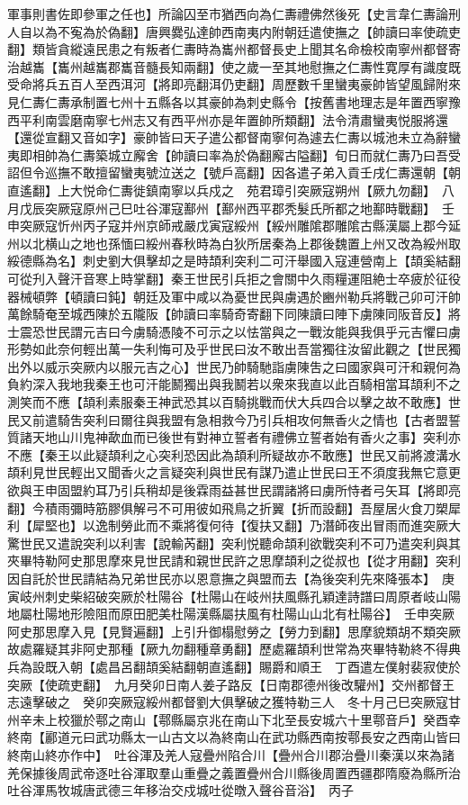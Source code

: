軍事則書佐即參軍之任也】所論囚至市猶西向為仁夀禮佛然後死【史言韋仁夀論刑人自以為不寃為於偽翻】唐興爨弘達帥西南夷内附朝廷遣使撫之【帥讀曰率使疏吏翻】類皆貪縱遠民患之有叛者仁夀時為巂州都督長史上聞其名命檢校南寧州都督寄治越巂【巂州越巂郡巂音髓長知兩翻】使之歲一至其地慰撫之仁夀性寛厚有識度既受命將兵五百人至西洱河【將即亮翻洱仍吏翻】周歷數千里蠻夷豪帥皆望風歸附來見仁夀仁夀承制置七州十五縣各以其豪帥為刺史縣令【按舊書地理志是年置西寧豫西平利南雲磨南寧七州志又有西平州亦是年置帥所類翻】法令清肅蠻夷悦服將還【還從宣翻又音如字】豪帥皆曰天子遣公都督南寧何為遽去仁夀以城池未立為辭蠻夷即相帥為仁夀築城立廨舍【帥讀曰率為於偽翻廨古隘翻】旬日而就仁夀乃曰吾受詔但令巡撫不敢擅留蠻夷號泣送之【號戶高翻】因各遣子弟入貢壬戌仁夀還朝【朝直遙翻】上大悦命仁夀徙鎮南寧以兵戍之　苑君璋引突厥寇朔州【厥九勿翻】　八月戊辰突厥寇原州己巳吐谷渾寇鄯州【鄯州西平郡秃髮氏所都之地鄯時戰翻】　壬申突厥寇忻州丙子寇并州京師戒嚴戊寅寇綏州【綏州雕隂郡雕隂古縣漢屬上郡今延州以北横山之地也孫愐曰綏州春秋時為白狄所居秦為上郡後魏置上州又改為綏州取綏德縣為名】刺史劉大俱擊却之是時頡利突利二可汗舉國入寇連營南上【頡奚結翻可從刋入聲汗音寒上時掌翻】秦王世民引兵拒之會關中久雨糧運阻絶士卒疲於征役器械頓弊【頓讀曰鈍】朝廷及軍中咸以為憂世民與虜遇於豳州勒兵將戰己卯可汗帥萬餘騎奄至城西陳於五隴阪【帥讀曰率騎奇寄翻下同陳讀曰陣下虜陳同阪音反】將士震恐世民謂元吉曰今虜騎憑陵不可示之以怯當與之一戰汝能與我俱乎元吉懼曰虜形勢如此奈何輕出萬一失利悔可及乎世民曰汝不敢出吾當獨往汝留此觀之【世民獨出外以威示突厥内以服元吉之心】世民乃帥騎馳詣虜陳吿之曰國家與可汗和親何為負約深入我地我秦王也可汗能鬭獨出與我鬭若以衆來我直以此百騎相當耳頡利不之測笑而不應【頡利素服秦王神武恐其以百騎挑戰而伏大兵四合以擊之故不敢應】世民又前遣騎吿突利曰爾往與我盟有急相救今乃引兵相攻何無香火之情也【古者盟誓質諸天地山川鬼神歃血而已後世有對神立誓者有禮佛立誓者始有香火之事】突利亦不應【秦王以此疑頡利之心突利恐因此為頡利所疑故亦不敢應】世民又前將渡溝水頡利見世民輕出又聞香火之言疑突利與世民有謀乃遣止世民曰王不須度我無它意更欲與王申固盟約耳乃引兵稍却是後霖雨益甚世民謂諸將曰虜所恃者弓矢耳【將即亮翻】今積雨彌時筋膠俱解弓不可用彼如飛鳥之折翼【折而設翻】吾屋居火食刀槊犀利【犀堅也】以逸制勞此而不乘將復何待【復扶又翻】乃潛師夜出冒雨而進突厥大驚世民又遣說突利以利害【說輸芮翻】突利悦聽命頡利欲戰突利不可乃遣突利與其夾畢特勒阿史那思摩來見世民請和親世民許之思摩頡利之從叔也【從才用翻】突利因自託於世民請結為兄弟世民亦以恩意撫之與盟而去【為後突利先來降張本】　庚寅岐州刺史柴紹破突厥於杜陽谷【杜陽山在岐州扶風縣孔穎達詩譜曰周原者岐山陽地屬杜陽地形險阻而原田肥美杜陽漢縣屬扶風有杜陽山山北有杜陽谷】　壬申突厥阿史那思摩入見【見賢遍翻】上引升御榻慰勞之【勞力到翻】思摩貌類胡不類突厥故處羅疑其非阿史那種【厥九勿翻種章勇翻】歷處羅頡利世常為夾畢特勒終不得典兵為設既入朝【處昌呂翻頡奚結翻朝直遙翻】賜爵和順王　丁酉遣左僕射裴寂使於突厥【使疏吏翻】　九月癸卯日南人姜子路反【日南郡德州後改驩州】交州都督王志遠擊破之　癸卯突厥寇綏州都督劉大俱擊破之獲特勒三人　冬十月己巳突厥寇甘州辛未上校獵於鄠之南山【鄠縣屬京兆在南山下北至長安城六十里鄠音戶】癸酉幸終南【酈道元曰武功縣太一山古文以為終南山在武功縣西南按鄠長安之西南山皆曰終南山終亦作中】　吐谷渾及羌人寇疊州陷合川【疊州合川郡治疊川秦漢以來為諸羌保據後周武帝逐吐谷渾取羣山重疊之義置疊州合川縣後周置西疆郡隋廢為縣所治吐谷渾馬牧城唐武德三年移治交戍城吐從暾入聲谷音浴】　丙子